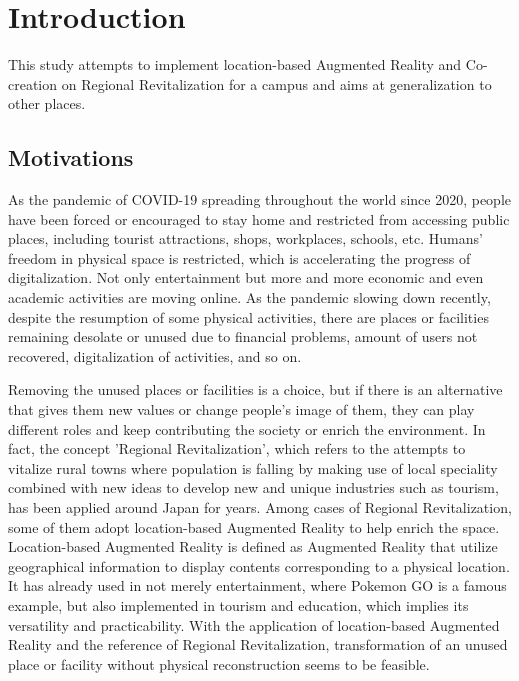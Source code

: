 \chapter{Introduction}

This study attempts to implement location-based Augmented Reality and Co-creation on Regional Revitalization for a campus and aims at generalization to other places.

\section{Motivations}

As the pandemic of COVID-19 spreading throughout the world since 2020,
people have been forced or encouraged to stay home and restricted from accessing public places,
including tourist attractions, shops, workplaces, schools, etc.
Humans' freedom in physical space is restricted, which is accelerating the progress of digitalization.
Not only entertainment but more and more economic and even academic activities are moving online.
As the pandemic slowing down recently, despite the resumption of some physical activities,
there are places or facilities remaining desolate or unused due to financial problems,
amount of users not recovered, digitalization of activities, and so on.

Removing the unused places or facilities is a choice, but if there is an alternative that gives them new values or change people's image of them,
they can play different roles and keep contributing the society or enrich the environment.
In fact, the concept 'Regional Revitalization', which refers to the attempts to vitalize rural towns where population is falling
by making use of local speciality combined with new ideas to develop new and unique industries such as tourism, has been applied around Japan for years.
Among cases of Regional Revitalization, some of them adopt location-based Augmented Reality to help enrich the space.
Location-based Augmented Reality is defined as Augmented Reality that utilize geographical information to display contents corresponding to a physical location.
It has already used in not merely entertainment, where Pokemon GO is a famous example,
but also implemented in tourism and education, which implies its versatility and practicability.
With the application of location-based Augmented Reality and the reference of Regional Revitalization,
transformation of an unused place or facility without physical reconstruction seems to be feasible.


